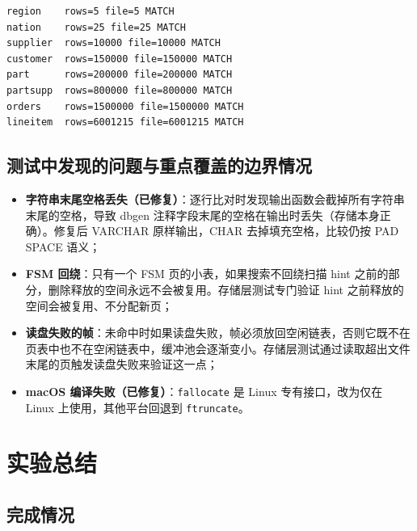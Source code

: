 \documentclass[11pt,a4paper]{ctexart}
\newcommand{\code}[1]{\texttt{#1}}
\begin{document}
\begin{lstlisting}[style=plain]
region    rows=5 file=5 MATCH
nation    rows=25 file=25 MATCH
supplier  rows=10000 file=10000 MATCH
customer  rows=150000 file=150000 MATCH
part      rows=200000 file=200000 MATCH
partsupp  rows=800000 file=800000 MATCH
orders    rows=1500000 file=1500000 MATCH
lineitem  rows=6001215 file=6001215 MATCH
\end{lstlisting}

\subsection{测试中发现的问题与重点覆盖的边界情况}

\begin{itemize}
  \item \textbf{字符串末尾空格丢失（已修复）}：逐行比对时发现输出函数会截掉所有字符串末尾的空格，导致 dbgen 注释字段末尾的空格在输出时丢失（存储本身正确）。修复后 VARCHAR 原样输出，CHAR 去掉填充空格，比较仍按 PAD SPACE 语义；
  \item \textbf{FSM 回绕}：只有一个 FSM 页的小表，如果搜索不回绕扫描 hint 之前的部分，删除释放的空间永远不会被复用。存储层测试专门验证 hint 之前释放的空间会被复用、不分配新页；
  \item \textbf{读盘失败的帧}：未命中时如果读盘失败，帧必须放回空闲链表，否则它既不在页表中也不在空闲链表中，缓冲池会逐渐变小。存储层测试通过读取超出文件末尾的页触发读盘失败来验证这一点；
  \item \textbf{macOS 编译失败（已修复）}：\code{fallocate} 是 Linux 专有接口，改为仅在 Linux 上使用，其他平台回退到 \code{ftruncate}。
\end{itemize}

\section{实验总结}

\subsection{完成情况}
\end{document}
